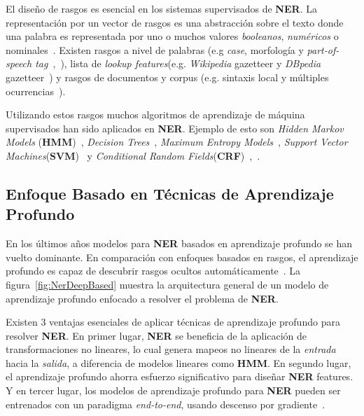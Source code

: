 El dise\~no de rasgos es esencial en los sistemas supervisados de \textbf{NER}. La representaci\'on por un vector de rasgos es una abstracci\'on sobre el texto donde una palabra es representada por uno o muchos valores \emph{booleanos}, \emph{num\'ericos} o nominales~\cite{sekine2009named}. Existen rasgos a nivel de palabras (e.g \emph{case}, morfolog\'ia y \emph{part-of-speech tag}~\cite{settles2004biomedical},~\cite{liao2009simple}), lista de \emph{lookup features}(e.g. \emph{Wikipedia} gazetteer y \emph{DBpedia} gazetteer~\cite{hoffart2011robust}) y rasgos de documentos y corpus (e.g. sintaxis local y m\'ultiples ocurrencias~\cite{ji2016joint}).

Utilizando estos rasgos muchos algoritmos de aprendizaje de m\'aquina supervisados han sido aplicados en \textbf{NER}. Ejemplo de esto son \emph{Hidden Markov Models} (\textbf{HMM})~\cite{bikel1999algorithm}, \emph{Decision Trees}~\cite{szarvas2006multilingual}, \emph{Maximum Entropy Models}~\cite{bender2003maximum}, \emph{Support Vector Machines}(\textbf{SVM})~\cite{li2004svm} y \emph{Conditional Random Fields}(\textbf{CRF})~\cite{settles2004biomedical},~\cite{lafferty2001conditional}.

\subsection{Enfoque Basado en T\'ecnicas de Aprendizaje Profundo}
En los \'ultimos a\~nos modelos para \textbf{NER} basados en aprendizaje profundo se han vuelto dominante. En comparaci\'on con enfoques basados en rasgos, el aprendizaje profundo es capaz de descubrir rasgos ocultos autom\'aticamente~\cite{li2018survey}. La figura~\ref{fig:NerDeepBased} muestra la arquitectura general de un modelo de aprendizaje profundo enfocado a resolver el problema de \textbf{NER}. 

Existen 3 ventajas esenciales de aplicar t\'ecnicas de aprendizaje profundo para resolver \textbf{NER}. En primer lugar, \textbf{NER} se beneficia de la aplicaci\'on de transformaciones no lineares, lo cual genera mapeos no lineares de la \emph{entrada} hacia la \emph{salida}, a diferencia de modelos lineares como \textbf{HMM}. En segundo lugar, el aprendizaje profundo ahorra esfuerzo significativo para dise\~nar \textbf{NER} features. Y en tercer lugar, los modelos de aprendizaje profundo para \textbf{NER} pueden ser entrenados con un paradigma \emph{end-to-end}, usando descenso por gradiente~\cite{li2018survey}.

